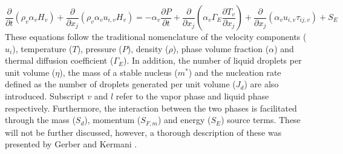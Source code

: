 \documentclass[12pt]{article}
\begin{document}
\begin{equation}
    \frac{\partial}{\partial t}(\rho_{v}\alpha_{v}H_{v})+\frac{\partial}{\partial x_{j}}(\rho_{v}\alpha_{v}u_{i,v}H_{v}) =-\alpha_{v}\frac{\partial P}{\partial t}+\frac{\partial}{\partial x_{j}}(\alpha_{v}\Gamma _{E}\frac{\partial T_{v}}{\partial x_{j}})+\frac{\partial}{\partial x_{j}}(\alpha_{v}u_{i,v}\tau_{ij,v}) + S_{E} 
    \label{eq:v_energy}
\end{equation}
These equations follow the traditional nomenclature of the velocity components ($u_{i}$), temperature ($T$), pressure ($P$), density ($\rho$), phase volume fraction ($\alpha$) and thermal diffusion coefficient ($\Gamma_{E} $). In addition, the number of liquid droplets per unit volume ($\eta$), the mass of a stable nucleus ($m^*$) and the nucleation rate defined as the number of droplets generated per unit volume ($J_{d}$) are also introduced. Subscript $v$ and $l$  refer to the vapor phase and liquid phase respectively. Furthermore, the interaction between the two phases is facilitated through the mass ($S_{d}$), momentum ($S_{F,m}$) and energy ($S_{E}$) source terms. These will not be further discussed, however, a thorough description of these was presented by Gerber and Kermani \cite{gerber2004pressure}.
\end{document}

